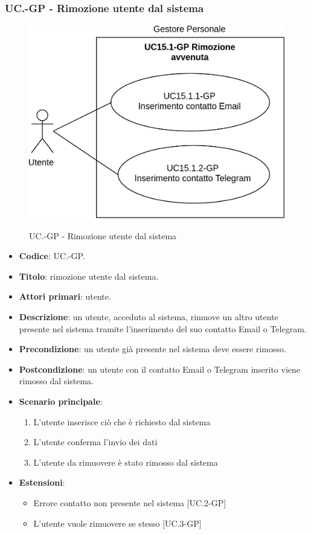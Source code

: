 	\subsubsection{UC\theuccount.\thesubuccount-GP - Rimozione utente dal sistema}
		\begin{figure}[H]
			\centering
			\includegraphics[width=0.6\columnwidth]{img/casi_d'uso/UC15_1.png}\\
			\caption{UC\theuccount.\thesubuccount-GP - Rimozione utente dal sistema}
		\end{figure}
		\begin{itemize}
			\item \textbf{Codice}: UC\theuccount.\thesubuccount-GP.
			\item \textbf{Titolo}: rimozione utente dal sistema.
			\item \textbf{Attori primari}: utente.
			\item \textbf{Descrizione}: un utente, acceduto al sistema, rimuove un altro utente presente nel sistema tramite l'inserimento del suo contatto Email o Telegram.
			\item \textbf{Precondizione}: un utente già presente nel sistema deve essere rimosso.
			\item \textbf{Postcondizione}: un utente con il contatto Email o Telegram inserito viene rimosso dal sistema.
			\item \textbf{Scenario principale}:
			\begin{enumerate}
				\item L'utente inserisce ciò che è richiesto dal sistema
				\item L'utente conferma l'invio dei dati
				\item L'utente da rimuovere è stato rimosso dal sistema
			\end{enumerate}
			\item \textbf{Estensioni}:
			\begin{itemize}
				\item Errore contatto non presente nel sistema [UC\theuccount.2-GP]
				\item L'utente vuole rimuovere se stesso [UC\theuccount.3-GP]
			\end{itemize}
		\end{itemize}
			
